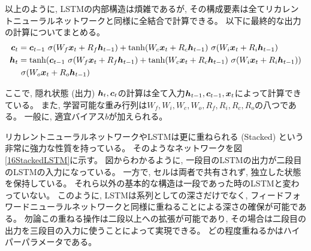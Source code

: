 以上のように, LSTMの内部構造は煩雑であるが, その構成要素は全てリカレントニューラルネットワークと同様に全結合で計算できる。
以下に最終的な出力の計算についてまとめる。
\begin{equation}
 \begin{split}
  {\mbox{\boldmath{$c$}}}_{t} 
  &= {\mbox{\boldmath{$c$}}}_{t-1} \  \sigma (W_f {\mbox{\boldmath{$x$}}}_t + R_f {\mbox{\boldmath{$h$}}}_{t-1}) 
  + \tanh (W_c {\mbox{\boldmath{$x$}}}_t + R_c {\mbox{\boldmath{$h$}}}_{t-1}) \  \sigma (W_i {\mbox{\boldmath{$x$}}}_t + R_i {\mbox{\boldmath{$h$}}}_{t-1})\\
  {\mbox{\boldmath{$h$}}}_{t} 
  &= \tanh({\mbox{\boldmath{$c$}}}_{t-1} \  \sigma (W_f {\mbox{\boldmath{$x$}}}_t + R_f {\mbox{\boldmath{$h$}}}_{t-1}) 
  + \tanh (W_c {\mbox{\boldmath{$x$}}}_t + R_c {\mbox{\boldmath{$h$}}}_{t-1}) \  \sigma (W_i {\mbox{\boldmath{$x$}}}_t + R_i {\mbox{\boldmath{$h$}}}_{t-1})) \\
  &\  \sigma (W_o {\mbox{\boldmath{$x$}}}_t + R_o {\mbox{\boldmath{$h$}}}_{t-1})
 \end{split}
\end{equation}

ここで, 隠れ状態 (出力) ${\mbox{\boldmath{$h$}}}_t,{\mbox{\boldmath{$c$}}}_t$の計算は全て入力${\mbox{\boldmath{$h$}}}_{t-1},{\mbox{\boldmath{$c$}}}_{t-1},{\mbox{\boldmath{$x$}}}_t$によって計算できている。
また, 学習可能な重み行列は$W_f, W_i, W_c, W_o, R_f, R_i, R_c, R_o$の八つである。
一般に, 適宜バイアス$b$が加えられる。

リカレントニューラルネットワークやLSTMは更に重ねられる (Stacked) という非常に強力な性質を持っている。
そのようなネットワークを図\ref{16StackedLSTM}に示す。
図からわかるように, 一段目のLSTMの出力が二段目のLSTMの入力になっている。
一方で, セルは両者で共有されず, 独立した状態を保持している。
それら以外の基本的な構造は一段であった時のLSTMと変わっていない。
このように, LSTMは系列としての深さだけでなく, フィードフォワードニューラルネットワークと同様に重ねることによる深さの確保が可能である。
勿論この重ねる操作は二段以上への拡張が可能であり, その場合は二段目の出力を三段目の入力に使うことによって実現できる。
どの程度重ねるかはハイパーパラメータである。

